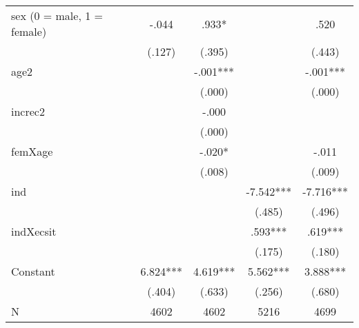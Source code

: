 {\begin{tabular}{l*{4}{c}}
sex (0 = male, 1 = female)                        &       -.044   &        .933*  &               &        .520   \\
                                                  &      (.127)   &      (.395)   &               &      (.443)   \\
age2                                              &               &       -.001***&               &       -.001***\\
                                                  &               &      (.000)   &               &      (.000)   \\
increc2                                           &               &       -.000   &               &               \\
                                                  &               &      (.000)   &               &               \\
femXage                                           &               &       -.020*  &               &       -.011   \\
                                                  &               &      (.008)   &               &      (.009)   \\
ind                                               &               &               &      -7.542***&      -7.716***\\
                                                  &               &               &      (.485)   &      (.496)   \\
indXecsit                                         &               &               &        .593***&        .619***\\
                                                  &               &               &      (.175)   &      (.180)   \\
Constant                                          &       6.824***&       4.619***&       5.562***&       3.888***\\
                                                  &      (.404)   &      (.633)   &      (.256)   &      (.680)   \\
\hline
N                                                 &        4602   &        4602   &        5216   &        4699   \\
\hline\hline
\end{tabular}
}
